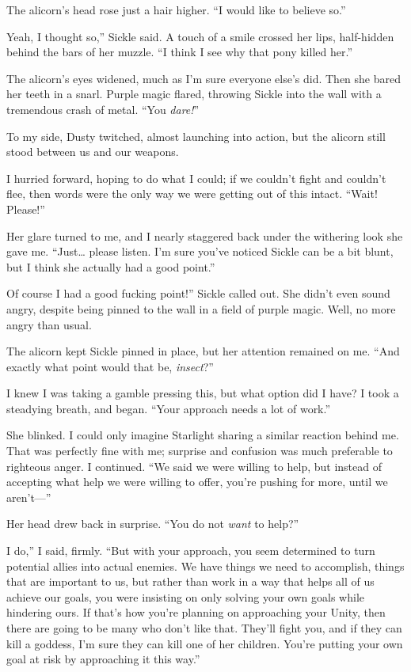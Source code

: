 The alicorn’s head rose just a hair higher. “I would like to believe so.”

\leavevmode{}Yeah, I thought so,” Sickle said. A touch of a smile crossed her lips, half-hidden behind the bars of her muzzle. “I think I see why that pony killed her.”

The alicorn’s eyes widened, much as I’m sure everyone else’s did. Then she bared her teeth in a snarl. Purple magic flared, throwing Sickle into the wall with a tremendous crash of metal. “You \textit{dare!}”

To my side, Dusty twitched, almost launching into action, but the alicorn still stood between us and our weapons.

I hurried forward, hoping to do what I could; if we couldn’t fight and couldn’t flee, then words were the only way we were getting out of this intact. “Wait! Please!”

Her glare turned to me, and I nearly staggered back under the withering look she gave me. “Just… please listen. I’m sure you’ve noticed Sickle can be a bit blunt, but I think she actually had a good point.”

\leavevmode{}Of course I had a good fucking point!” Sickle called out. She didn’t even sound angry, despite being pinned to the wall in a field of purple magic. Well, no more angry than usual.

The alicorn kept Sickle pinned in place, but her attention remained on me. “And exactly what point would that be, \textit{insect}?”

I knew I was taking a gamble pressing this, but what option did I have? I took a steadying breath, and began. “Your approach needs a lot of work.”

She blinked. I could only imagine Starlight sharing a similar reaction behind me. That was perfectly fine with me; surprise and confusion was much preferable to righteous anger. I continued. “We said we were willing to help, but instead of accepting what help we were willing to offer, you’re pushing for more, until we aren’t—”

Her head drew back in surprise. “You do not \textit{want} to help?”

\leavevmode{}I do,” I said, firmly. “But with your approach, you seem determined to turn potential allies into actual enemies. We have things we need to accomplish, things that are important to us, but rather than work in a way that helps all of us achieve our goals, you were insisting on only solving your own goals while hindering ours. If that’s how you’re planning on approaching your Unity, then there are going to be many who don’t like that. They’ll fight you, and if they can kill a goddess, I’m sure they can kill one of her children. You’re putting your own goal at risk by approaching it this way.”

